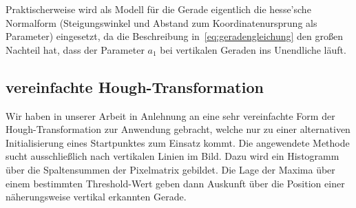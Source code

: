 Praktischerweise wird als Modell für die Gerade eigentlich die hesse'sche Normalform (Steigungswinkel und Abstand zum Koordinatenursprung als Parameter) eingesetzt, da die Beschreibung in~\ref{eq:geradengleichung} den großen Nachteil hat, dass der Parameter \( a_1 \) bei vertikalen Geraden ins Unendliche läuft. 

\subsection{vereinfachte Hough-Transformation}
Wir haben in unserer Arbeit in Anlehnung an \autocite{alyRealTimeDetection2008} eine sehr vereinfachte Form der Hough-Transformation zur Anwendung gebracht, welche nur zu einer alternativen Initialisierung eines Startpunktes zum Einsatz kommt. Die angewendete Methode sucht ausschließlich nach vertikalen Linien im Bild. Dazu wird ein Histogramm über die Spaltensummen der Pixelmatrix gebildet. Die Lage der Maxima über einem bestimmten Threshold-Wert geben dann Auskunft über die Position einer näherungsweise vertikal erkannten Gerade.